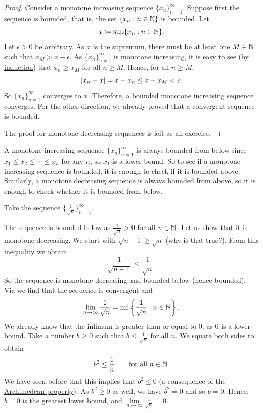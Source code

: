 \begin{proof}
Consider a monotone increasing sequence $\{ x_n \}_{n=1}^\infty$.  Suppose 
first the sequence is bounded,
that is,
the set $\{ x_n : n \in  {\mathbb{N}} \}$ is bounded.  Let
\begin{equation*}
x \coloneqq \sup \{ x_n : n \in {\mathbb{N}} \} .
\end{equation*}
Let $\epsilon > 0$ be arbitrary.  As $x$ is the supremum,
there must be at least one $M \in {\mathbb{N}}$ such that $x_{M} > x-\epsilon$.
As $\{ x_n \}_{n=1}^\infty$ is monotone increasing,
it is easy to see (by \hyperref[induction:thm]{induction}) that
$x_n \geq x_{M}$ for all $n \geq M$.  Hence, for all $n \geq M$,
\begin{equation*}
\lvert {x_n-x} \rvert = x-x_n \leq x-x_{M} < \epsilon  .
\end{equation*}
So $\{ x_n \}_{n=1}^\infty$ converges to $x$.
Therefore, a bounded monotone increasing sequence converges.
For the other direction, we already proved that a convergent sequence
is bounded.

The proof for monotone decreasing sequences is left as an exercise.
\end{proof}

A monotone increasing sequence $\{ x_n \}_{n=1}^\infty$
is always bounded from below since $x_1 \leq x_2 \leq \cdots \leq x_n$
for any $n$, so $x_1$ is a lower bound.  So to see if a 
monotone increasing sequence is bounded, it is enough to check if
it is bounded above.  Similarly, a monotone decreasing sequence
is always bounded from above, so it is enough to check whether it
is bounded from below.

\begin{example}
Take the sequence $\bigl\{ \frac{1}{\sqrt{n}} \bigr\}_{n=1}^\infty$.

The sequence is
bounded below as
$\frac{1}{\sqrt{n}} > 0$ for all $n \in {\mathbb{N}}$.
Let us show that it is monotone decreasing.  We start with
$\sqrt{n+1} \geq \sqrt{n}$ (why is that true?).  From this inequality
we obtain
\begin{equation*}
\frac{1}{\sqrt{n+1}} \leq \frac{1}{\sqrt{n}} .
\end{equation*}
So the sequence is monotone decreasing and bounded below (hence
bounded).  Via  we find that the sequence is
convergent and
\begin{equation*}
\lim_{n\to \infty} \frac{1}{\sqrt{n}}
=
\inf \left\{ \frac{1}{\sqrt{n}} : n \in {\mathbb{N}} \right\} .
\end{equation*}
We already know that the infimum is greater than or equal to 0, as
0 is a lower bound.  Take a number $b \geq 0$ such
that $b \leq \frac{1}{\sqrt{n}}$ for all $n$.  We square both sides to
obtain
\begin{equation*}
b^2 \leq \frac{1}{n} \qquad \text{for all } n \in {\mathbb{N}}.
\end{equation*}
We have seen before that this implies that $b^2 \leq 0$ (a consequence
of the \hyperref[thm:arch:i]{Archimedean property}).  As $b^2 \geq 0$ as
well, we have $b^2 = 0$
and so $b = 0$.
Hence, $b=0$ is the greatest lower bound, and $\lim\limits_{n\to\infty} \frac{1}{\sqrt{n}} = 0$.
\end{example}

